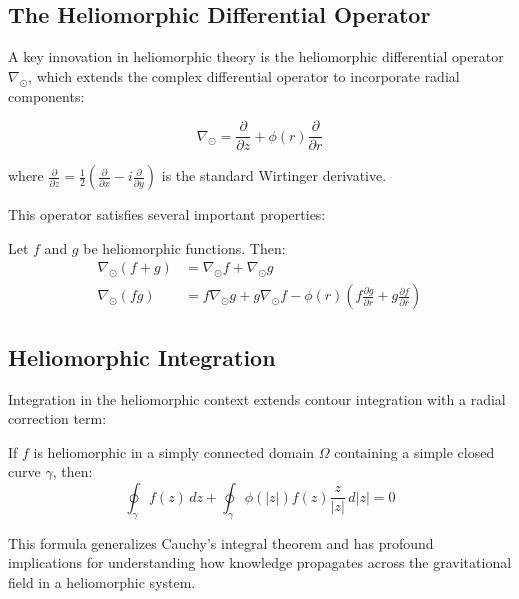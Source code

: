 \subsection{The Heliomorphic Differential Operator}

A key innovation in heliomorphic theory is the heliomorphic differential operator $\nabla_{\odot}$, which extends the complex differential operator to incorporate radial components:

\begin{equation}
\nabla_{\odot} = \frac{\partial}{\partial z} + \phi(r) \frac{\partial}{\partial r}
\end{equation}

where $\frac{\partial}{\partial z} = \frac{1}{2}\left(\frac{\partial}{\partial x} - i\frac{\partial}{\partial y}\right)$ is the standard Wirtinger derivative.

This operator satisfies several important properties:

\begin{proposition}
Let $f$ and $g$ be heliomorphic functions. Then:
\begin{align}
\nabla_{\odot}(f + g) &= \nabla_{\odot}f + \nabla_{\odot}g \\
\nabla_{\odot}(fg) &= f\nabla_{\odot}g + g\nabla_{\odot}f - \phi(r)(f\frac{\partial g}{\partial r} + g\frac{\partial f}{\partial r})
\end{align}
\end{proposition}

\subsection{Heliomorphic Integration}

Integration in the heliomorphic context extends contour integration with a radial correction term:

\begin{theorem}
If $f$ is heliomorphic in a simply connected domain $\Omega$ containing a simple closed curve $\gamma$, then:
\begin{equation}
\oint_{\gamma} f(z) \, dz + \oint_{\gamma} \phi(|z|) f(z) \frac{z}{|z|} \, d|z| = 0
\end{equation}
\end{theorem}

This formula generalizes Cauchy's integral theorem and has profound implications for understanding how knowledge propagates across the gravitational field in a heliomorphic system.

